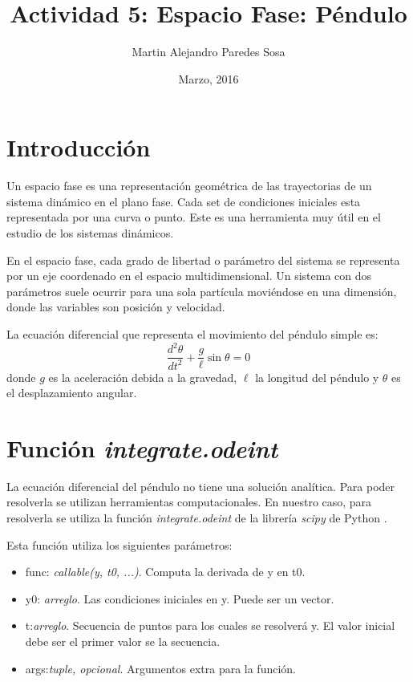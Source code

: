 \documentclass[12pt]{article}
\title{Actividad 5: Espacio Fase: Péndulo}
\author{Martin Alejandro Paredes Sosa}
\date{Marzo, 2016}
\begin{document}
\maketitle

\section{Introducción}
Un espacio fase es una representación geométrica de las trayectorias de un sistema dinámico en el plano fase. Cada set de condiciones iniciales esta representada por una curva o punto. Este es una herramienta muy útil en el estudio de los sistemas dinámicos.

En el espacio fase, cada grado de libertad o parámetro del sistema se representa por un eje coordenado en el espacio multidimensional. Un sistema con dos parámetros suele ocurrir para una sola partícula moviéndose en una dimensión, donde las variables son posición y velocidad.

La ecuación diferencial que representa el movimiento del péndulo simple es:
\begin{equation}\label{Pen}
	\frac{d^2\theta}{dt^2}+\frac{g}{\ell}\sin\theta=0
\end{equation}
donde $g$ es la aceleración debida a la gravedad, $\ell$ la longitud del péndulo y $\theta$ es el desplazamiento angular.


\section{Función \emph{integrate.odeint}}
La ecuación diferencial del péndulo no tiene una solución analítica. Para poder resolverla se utilizan herramientas computacionales. En nuestro caso, para resolverla se utiliza la función \emph{integrate.odeint} de la librería \emph{scipy} de Python \cite{scipy}.

Esta función utiliza los siguientes parámetros:
\begin{itemize}
	\item func: \textit{callable(y, t0, ...)}. Computa la derivada de y en t0.
	\item y0: \textit{arreglo}. Las condiciones iniciales en y. Puede ser un vector.
	\item t:\textit{arreglo}. Secuencia de puntos para los cuales se resolverá y. El valor inicial debe ser el primer valor se la secuencia.
	\item args:\textit{tuple, opcional}. Argumentos extra para la función.
\end{itemize}
\end{document}
